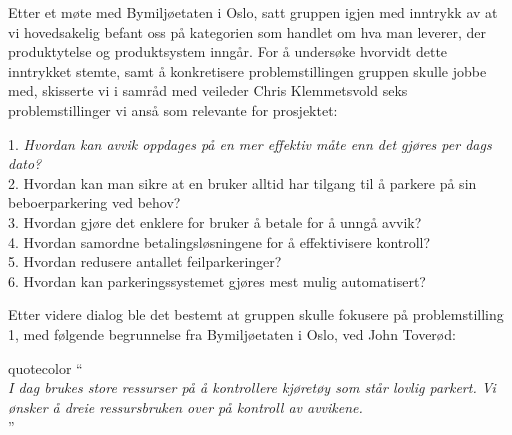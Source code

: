 \documentclass[xetex]{beamer}
\begin{document}
\begin{frame}
	Etter et møte med Bymiljøetaten i Oslo, satt gruppen igjen med inntrykk av at vi hovedsakelig befant oss på kategorien som handlet om hva man leverer, der \alert{produktytelse og produktsystem} inngår. For å undersøke hvorvidt dette inntrykket stemte, samt å konkretisere problemstillingen gruppen skulle jobbe med, skisserte vi i samråd med veileder Chris Klemmetsvold \alert{seks problemstillinger} vi anså som relevante for prosjektet:
	
	\hspace{2em}\alert{1.} \emph{Hvordan kan avvik \alert{oppdages} på en mer effektiv måte enn det gjøres per dags dato?} \\
	\hspace{2em}\alert{2.} Hvordan kan man sikre at en bruker alltid har tilgang til å parkere på sin \alert{beboerparkering} ved behov?  \\
	\hspace{2em}\alert{3.} Hvordan gjøre det enklere for bruker å \alert{betale} for å unngå avvik?  \\
	\hspace{2em}\alert{4.} Hvordan \alert{samordne} betalingsløsningene for å effektivisere kontroll?  \\
	\hspace{2em}\alert{5.} Hvordan \alert{redusere} antallet feilparkeringer?  \\
	\hspace{2em}\alert{6.} Hvordan kan parkeringssystemet gjøres mest mulig \alert{automatisert}?
	
	Etter videre dialog ble det bestemt at gruppen skulle fokusere på \alert{problemstilling 1}, med følgende begrunnelse fra Bymiljøetaten i Oslo, ved John Toverød: 
	
	\hspace{2em}\begin{beamercolorbox}[wd=0.75\paperwidth, ht=8ex, dp=8pt, leftskip=.3cm, rightskip=.3cm]{quotecolor}
	\huge`` \\[-0.5em]
    \tiny
    \hspace{1.5em}\vspace{0.0em}\emph{I dag brukes store ressurser på å kontrollere kjøretøy som står lovlig parkert. Vi ønsker å dreie ressursbruken over på kontroll av avvikene.} \\ [-1.8em]
    
    \hspace{0.70\paperwidth}\huge'' \\ [-0.3em]
\end{beamercolorbox}


\end{frame}
\end{document}
